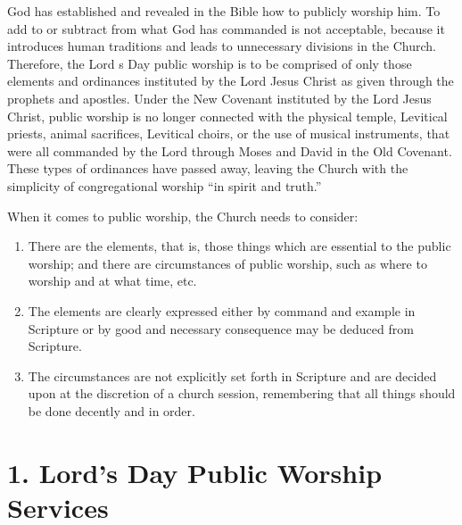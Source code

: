 God has established and revealed in the Bible how to publicly worship him. To add to or subtract from what God has commanded is not acceptable, because it introduces human traditions and leads to unnecessary divisions in the Church. Therefore, the Lord
s Day public worship is to be comprised of only those elements and ordinances instituted by the Lord Jesus Christ as given through the prophets and apostles. Under the New Covenant instituted by the Lord Jesus Christ, public worship is no longer connected with the physical temple, Levitical priests, animal sacrifices, Levitical choirs, or the use of musical instruments, that were all commanded by the Lord through Moses and David in the Old Covenant. These types of ordinances have passed away, leaving the Church with the simplicity of congregational worship ``in spirit and truth.'' 

When it comes to public worship, the Church needs to consider: 

\begin {enumerate}[label=(\alph*)]
\item There are the elements, that is, those things which are essential to the public worship; and there are circumstances of public worship, such as where to worship and at what time, etc. 
\item The elements are clearly expressed either by command and example in Scripture or by good and necessary consequence may be deduced from Scripture. 
\item The circumstances are not explicitly set forth in Scripture and are decided upon at the discretion of a church session, remembering that all things should be done decently and in order.
\end {enumerate}

\section{1. Lord's Day Public Worship Services}

